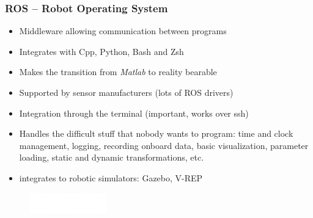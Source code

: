 \documentclass[aspectratio=1610]{beamer}
\begin{document}


\begin{frame}
  \frametitle{ROS -- Robot Operating System}

  \begin{itemize}
    \item Middleware allowing communication between programs
    \item Integrates with Cpp, Python, Bash and Zsh
    \item Makes the transition from \emph{Matlab} to reality bearable
    \item Supported by sensor manufacturers (lots of ROS drivers)
    \item Integration through the terminal (important, works over ssh)
    \item Handles the difficult stuff that nobody wants to program: time and clock management, logging, recording onboard data, basic visualization, parameter loading, static and dynamic transformations, etc.
    \item integrates to robotic simulators: Gazebo, V-REP
  \end{itemize}

  \begin{figure}
    \includegraphics[width=0.3\textwidth]{./fig/ros_logo.png}
  \end{figure}

\end{frame}

\end{document}
